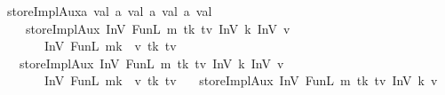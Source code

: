 \begin{isabellebody}
\isanewline
{}\isamarkupfalse%
\ storeImplAux{\isacharcolon}{\kern0pt}{\isacharcolon}{\kern0pt}{\isachardoublequoteopen}{\isacharprime}{\kern0pt}a\ val{}{}{}{}\ {\isasymRightarrow}{\isacharprime}{\kern0pt}a\ val{}{}{}{}\ {\isasymRightarrow}{\isacharprime}{\kern0pt}a\ val{}{}{}{}\ {\isasymRightarrow}{\isacharprime}{\kern0pt}a\ val{}{}{}{}{\isachardoublequoteclose}
\isanewline\ \ \isanewline
\ \ \ \ {\isachardoublequoteopen}storeImplAux\ {\isacharparenleft}{\kern0pt}InV{}\ {\isacharparenleft}{\kern0pt}FunL\ m\ tk\ tv{\isacharparenright}{\kern0pt}{\isacharparenright}{\kern0pt}\ {\isacharparenleft}{\kern0pt}InV{}\ k{\isacharparenright}{\kern0pt}\ {\isacharparenleft}{\kern0pt}InV{}{}\ v{\isacharparenright}{\kern0pt}\isanewline
\ \ \ \ \ \ {\isacharequal}{\kern0pt}\ {\isacharparenleft}{\kern0pt}InV{}\ {\isacharparenleft}{\kern0pt}FunL\ {\isacharparenleft}{\kern0pt}m{\isacharparenleft}{\kern0pt}k\ {\isacharcolon}{\kern0pt}{\isacharequal}{\kern0pt}\ v{\isacharparenright}{\kern0pt}{\isacharparenright}{\kern0pt}\ tk\ tv{\isacharparenright}{\kern0pt}{\isacharparenright}{\kern0pt}{\isachardoublequoteclose}\isanewline
\ \ {\isacharbar}{\kern0pt}\ {\isachardoublequoteopen}storeImplAux\ {\isacharparenleft}{\kern0pt}InV{}\ {\isacharparenleft}{\kern0pt}FunL\ m\ tk\ tv{\isacharparenright}{\kern0pt}{\isacharparenright}{\kern0pt}\ {\isacharparenleft}{\kern0pt}InV{}{}\ k{\isacharparenright}{\kern0pt}\ {\isacharparenleft}{\kern0pt}InV{}{}{}\ v{\isacharparenright}{\kern0pt}\isanewline
\ \ \ \ \ \ {\isacharequal}{\kern0pt}\ {\isacharparenleft}{\kern0pt}InV{}\ {\isacharparenleft}{\kern0pt}FunL\ {\isacharparenleft}{\kern0pt}m{\isacharparenleft}{\kern0pt}k\ {\isacharcolon}{\kern0pt}{\isacharequal}{\kern0pt}\ v{\isacharparenright}{\kern0pt}{\isacharparenright}{\kern0pt}\ tk\ tv{\isacharparenright}{\kern0pt}{\isacharparenright}{\kern0pt}{\isachardoublequoteclose}\isanewline
\ \ {\isacharbar}{\kern0pt}\ {\isachardoublequoteopen}storeImplAux\ {\isacharparenleft}{\kern0pt}InV{}\ {\isacharparenleft}{\kern0pt}FunL\ m\ tk\ tv{\isacharparenright}{\kern0pt}{\isacharparenright}{\kern0pt}\ {\isacharparenleft}{\kern0pt}InV{}{}{}\ k{\isacharparenright}{\kern0pt}\ {\isacharparenleft}{\kern0pt}v{\isacharparenright}{\kern0pt}\isanewline

\end{isabellebody}
